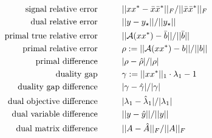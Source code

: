 \begin{enumerate}
\begin{subequations}  		\label{Eqn:term_crit-candidate_residuals}
\begin{align}
\text{signal relative error}
	& \hspace{1cm}	||xx^* - \bar{x}\bar{x}^*||_F / ||\bar{x}\bar{x}^*||_F \\
\text{dual relative error}
	&	\hspace{1cm} 	||y - y_\star|| / ||y_\star|| 	\\	
\text{primal true relative error}
	& \hspace{1cm} ||{\mathcal A}(xx^*)-\bar{b}|| / ||\bar{b}||  \\
\text{primal relative error}
	& \hspace{1cm}	\rho := ||{\mathcal A}(xx^*) - b|| / ||b||	 \\
\text{primal difference}
	& \hspace{1cm}	|\rho - \hat{\rho} | / | \rho| \\
\text{duality gap}
	& \hspace{1cm}	\gamma := ||xx^*||_1 \cdot \lambda_1 - 1 \\
\text{duality gap difference}
	& \hspace{1cm}	|\gamma - \hat{\gamma} | / |\gamma| \\
\text{dual objective difference}
	& \hspace{1cm}	|\lambda_1 - \hat{\lambda}_1| / |\lambda_1| \\
\text{dual variable difference}
	& \hspace{1cm}	||y- \hat{y}|| / ||y|| \\
\text{dual matrix difference}
	& \hspace{1cm}	||A - \hat{A}||_F / ||A||_F
\end{align}
\end{subequations}


\end{enumerate}

